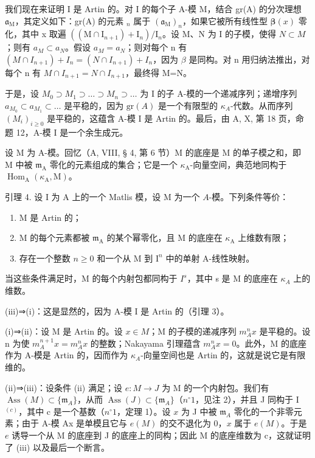 我们现在来证明 I 是 Artin 的。对 I 的每个子 A-模 M，结合 gr(A) 的分次理想 \(\mathfrak{a}_{\mathrm{M}}\)，其定义如下：gr(A) 的元素 \(_n\) 属于 \((\mathfrak{a}_{\mathrm{M}})_{n}\)，如果它被所有线性型 \(\boldsymbol{\beta}(x)\) 零化，其中 x 取遍 \(\left((\mathrm{M}\cap\mathrm{I}_{n+1})+\mathrm{I}_{n}\right)/\mathrm{I}_{n}\)。设 M、N 为 I 的子模，使得 \(N\subset M\)；则有 \(a_{M}\subset a_{N}\)。假设 \(a_{M}=a_{N}\)；则对每个 n 有 \((M\cap I_{n+1})+I_{n}=(N\cap I_{n+1})+I_{n}\)，因为 \(\beta\) 是同构。对 n 用归纳法推出，对每个 n 有 \(M\cap I_{n+1}=N\cap I_{n+1}\)，最终得 M=N。

于是，设 \(M_{0} \supset M_{1} \supset \ldots \supset M_{n} \supset \ldots\) 为 I 的子 A-模的一个递减序列；递增序列 \(a_{M_{0}} \subset a_{M_{1}} \subset \ldots\) 是平稳的，因为 \(\text{gr}(A)\) 是一个有限型的 \(\kappa_{A}\)-代数。从而序列 \((M_{i})_{i \geqslant 0}\) 是平稳的，这蕴含 A-模 I 是 Artin 的。最后，由 A, X, 第 18 页，命题 12，A-模 I 是一个余生成元。

设 M 为 A-模。回忆（A, VIII, § 4, 第 6 节）M 的底座是 M 的单子模之和，即 M 中被 \(\mathfrak{m}_{\mathrm{A}}\) 零化的元素组成的集合；它是一个 \(\kappa_{\mathrm{A}}\)-向量空间，典范地同构于 \(\operatorname{Hom}_{\mathrm{A}}(\kappa_{\mathrm{A}}, \mathrm{M})\)。

引理 4. 设 I 为 A 上的一个 Matlis 模，设 M 为一个 \(A\)-模。下列条件等价：

\begin{enumerate}
\def\labelenumi{(\roman{enumi})}
\item
  M 是 Artin 的；
\item
  M 的每个元素都被 \(\mathfrak{m}_{\mathrm{A}}\) 的某个幂零化，且 M 的底座在 \(\kappa_{\mathrm{A}}\) 上维数有限；
\item
  存在一个整数 \(n \geqslant 0\) 和一个从 M 到 \(\mathrm{I}^n\) 中的单射 A-线性映射。
\end{enumerate}

当这些条件满足时，M 的每个内射包都同构于 \(I^{s}\)，其中 s 是 M 的底座在 \(\kappa_{A}\) 上的维数。

(iii)⇒(i)：这是显然的，因为 A-模 I 是 Artin 的（引理 3）。

(i)⇒(ii)：设 M 是 Artin 的。设 \(x \in M\)；M 的子模的递减序列 \(m_{A}^{n}x\) 是平稳的。设 n 为使 \(m_{A}^{n+1}x = m_{A}^{n}x\) 的整数；Nakayama 引理蕴含 \(m_{A}^{n}x = 0\)。此外，M 的底座作为 A-模是 Artin 的，因而作为 \(\kappa_{A}\)-向量空间也是 Artin 的，这就是说它是有限维的。

(ii)⇒(iii)：设条件 (ii) 满足；设 \(e:M\to J\) 为 M 的一个内射包。我们有 \(\operatorname{Ass}(M)\subset\{\mathfrak{m}_{A}\}\)，从而 \(\operatorname{Ass}(J)\subset\{\mathfrak{m}_{A}\}\)（\(n^{\circ} 1\)，见注 2），并且 J 同构于 I \(^{(c)}\)，其中 c 是一个基数（\(n^{\circ} 1\)，定理 1）。设 \(x\) 为 J 中被 \(\mathfrak{m}_{A}\) 零化的一个非零元素；由于 A-模 Ax 是单模且它与 \(e(M)\) 的交不退化为 0，\(x\) 属于 \(e(M)\)。于是 \(e\) 诱导一个从 M 的底座到 J 的底座上的同构；因此 M 的底座维数为 c，这就证明了 (iii) 以及最后一个断言。

